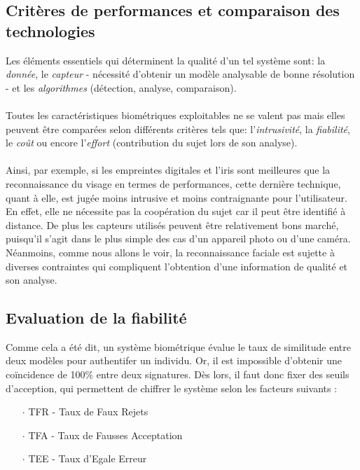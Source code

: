 \subsection{Critères de performances et comparaison des technologies}
Les éléments essentiels qui déterminent la qualité d'un tel système sont: la \textit{donnée}, le \textit{capteur} - nécessité d'obtenir un modèle analysable de bonne résolution - et les \textit{algorithmes} (détection, analyse, comparaison).
\paragraph{}
Toutes les caractéristiques biométriques exploitables ne se valent pas mais elles peuvent être comparées selon différents critères tels que: l'\textit{intrusivité}, la \textit{fiabilité}, le \textit{coût} ou encore l'\textit{effort} (contribution du sujet lors de son analyse).
\paragraph{}
Ainsi, par exemple, si les empreintes digitales et l'iris sont meilleures que la reconnaissance du visage en termes de performances, cette dernière technique, quant à elle, est jugée moins intrusive et moins contraignante pour l'utilisateur. En effet, elle ne nécessite pas la coopération du sujet car il peut être identifié à distance. De plus les capteurs utilisés peuvent être relativement bons marché, puisqu'il s'agit dans le plus simple des cas d'un appareil photo ou d'une caméra.
\\Néanmoins, comme nous allons le voir, la reconnaissance faciale est sujette à diverses contraintes qui compliquent l'obtention d'une information de qualité et son analyse.

\subsection{Evaluation de la fiabilité}
Comme cela a été dit, un système biométrique évalue le taux de similitude entre deux modèles pour authentifer un individu. Or, il est impossible d'obtenir une coïncidence de 100\% entre deux signatures. Dès lors, il faut donc fixer des seuils d'acception, qui permettent de chiffrer le système selon les facteurs suivants \cite{Xmisc_2}:
\begin{itemize}
\item[$\cdot$]\textsc{TFR} - Taux de Faux Rejets 
\item[$\cdot$]\textsc{TFA} - Taux de Fausses Acceptation
\item[$\cdot$]\textsc{TEE} - Taux d'Egale Erreur
\end{itemize}